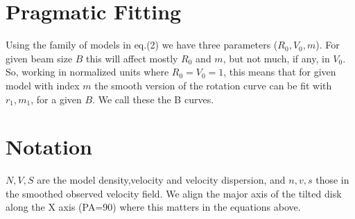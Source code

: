 \documentclass[12pt]{article}
\begin{document}
\section{Pragmatic Fitting}

Using the family of models in eq.(2) we have three parameters
($R_0,V_0,m$). For given beam size $B$ this will affect mostly $R_0$
and $m$, but not much, if any, in $V_0$. So, working in normalized
units where $R_0 = V_0 = 1$, this means that for given model with
index $m$ the smooth version of the rotation curve can be fit with
$r_1,m_1$, for a given $B$. We call these the B curves.


\section{Notation}

$N,V,S$ are the model density,velocity and velocity dispersion, and
$n,v,s$ those in the smoothed observed velocity field.  We align the
major axis of the tilted disk along the X axis (PA=90) where this
matters in the equations above.

  
\end{document}
